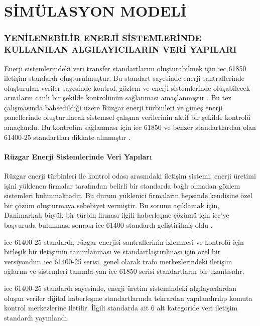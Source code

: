 \part{SİMÜLASYON MODELİ}
\thispagestyle{empty}
\newpage
\section{YENİLENEBİLİR ENERJİ SİSTEMLERİNDE KULLANILAN ALGILAYICILARIN VERİ YAPILARI}

Enerji sistemlerindeki veri transfer standartlarını oluşturabilmek için \gls{iec} 61850 iletişim standardı oluşturulmuştur. Bu standart sayesinde enerji santrallerinde oluşturulan veriler sayesinde kontrol, gözlem ve enerji sistemlerinde oluşabilecek arızaların canlı bir şekilde kontrolünün sağlanması amaçlanmıştır \cite{1385190}. Bu tez çalışmasında bahsedildiği üzere Rüzgar enerji türbinleri ve güneş enerji panellerinde oluşturulacak sistemsel çalışma verilerinin aktif bir şekilde kontrolü amaçlandu. Bu kontrolün sağlanması için \gls{iec} 61850 ve benzer standartlardan olan 61400-25 standartları dikkate alınmıştır \cite{Olsen_prototypeof} \cite{francisco2016protection}.


\subsection{Rüzgar Enerji Sistemlerinde Veri Yapıları}
Rüzgar enerji türbinleri ile kontrol odası arasındaki iletişim sistemi, enerji üretimi işini yüklenen firmalar tarafından belirli bir standarda bağlı olmadan gözlem sistemleri bulunmaktadır. Bu durum yüklenici firmaların hepsinde kendisine özel bir çözüm oluşturmaya sebebiyet vermiştir. Bu sorunu açıklamak için, Danimarkalı büyük bir türbin firması ilgili haberleşme çözümü için \gls{iec}'ye başvuruda bulunması sonrası \gls{iec} 61400 standardı geliştirilmiş oldu \cite{Olsen_prototypeof}.

\gls{iec} 61400-25 standardı, rüzgar enerjisi santrallerinin izlenmesi ve kontrolü için birleşik bir iletişimin tanımlanması ve standartlaştırılması için özel bir versiyondur. \gls{iec} 61400-25 serisi, genel olarak trafo merkezlerindeki iletişim ağlarını ve sistemleri tanımla-yan \gls{iec} 61850 serisi standartların bir uzantısıdır. 


\gls{iec} 61400-25 standardı sayesinde, enerji üretim sistemindeki algılayıcılardan oluşan veriler dijital haberleşme standartlarında tekrardan yapılandırılıp komuta kontrol merkezlerine iletilir. İlgili standarda ait 6 alt kategoride veri iletişim standardı yayınlandı.

